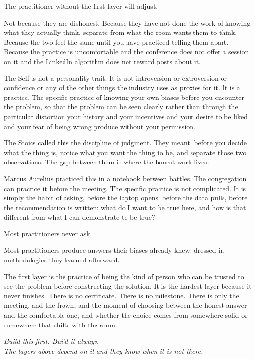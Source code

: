 The practitioner without the first layer will adjust.

Not because they are dishonest. Because they have not done the work of knowing what they actually think, separate from what the room wants them to think. Because the two feel the same until you have practiced telling them apart. Because the practice is uncomfortable and the conference does not offer a session on it and the LinkedIn algorithm does not reward posts about it.

The Self is not a personality trait. It is not introversion or extroversion or confidence or any of the other things the industry uses as proxies for it. It is a practice. The specific practice of knowing your own biases before you encounter the problem, so that the problem can be seen clearly rather than through the particular distortion your history and your incentives and your desire to be liked and your fear of being wrong produce without your permission.

The Stoics called this the discipline of judgment. They meant: before you decide what the thing is, notice what you want the thing to be, and separate those two observations. The gap between them is where the honest work lives.

Marcus Aurelius practiced this in a notebook between battles. The congregation can practice it before the meeting. The specific practice is not complicated. It is simply the habit of asking, before the laptop opens, before the data pulls, before the recommendation is written: what do I want to be true here, and how is that different from what I can demonstrate to be true?

Most practitioners never ask.

Most practitioners produce answers their biases already knew, dressed in methodologies they learned afterward.

The first layer is the practice of being the kind of person who can be trusted to see the problem before constructing the solution. It is the hardest layer because it never finishes. There is no certificate. There is no milestone. There is only the meeting, and the frown, and the moment of choosing between the honest answer and the comfortable one, and whether the choice comes from somewhere solid or somewhere that shifts with the room.

\begin{center}\small\itshape
  Build this first. Build it always.\\
  The layers above depend on it and they know when it is not there.
\end{center}

